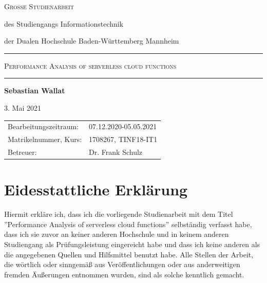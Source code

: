 \documentclass[12pt,a4paper,parskip=half]{scrreprt}
\begin{document}
\begin{titlepage}
{	}
	
	
	
	\bigskip
	
	
	
	\Large\textsc{Große Studienarbeit}
	
	
	
	\normalsize
	
	des Studiengangs Informationstechnik\par
	
	der Dualen Hochschule Baden-Württemberg Mannheim
	
	
	
	\rule{\textwidth}{.5mm}\bigskip
	
	
	
	\textsc{\large Performance Analysis of serverless cloud functions}	
	
	
	\rule{\textwidth}{.5mm}
	
	
	
	\vfill
	
	
	
	\par
	
	{\bfseries\large Sebastian Wallat}\par
	
	3. Mai 2021
	
	
	
	\vfill
	
	
	
	\small{%
		
		\begin{tabularx}{\textwidth}{@{}lX@{}}
			
			\toprule
			
			
			Bearbeitungszeitraum: & 07.12.2020-05.05.2021\\
			
			Matrikelnummer, Kurs: & 1708267, TINF18-IT1\\
			
			Betreuer: & Dr. Frank Schulz \\
			
		\end{tabularx}
		
	}
	
	\cleardoublepage
	
\end{titlepage}


\newpage
{}

\chapter*{Eidesstattliche Erklärung}
\vspace{50pt}
Hiermit erkläre ich, dass ich die vorliegende Studienarbeit mit dem Titel ''Performance Analysis of serverless cloud functions'' selbständig verfasst habe, dass ich sie zuvor an keiner anderen Hochschule und in keinem anderen Studiengang als Prüfungsleistung eingereicht habe und dass ich
keine anderen als die angegebenen Quellen und Hilfsmittel benutzt habe. Alle
Stellen der Arbeit, die wörtlich oder sinngemäß aus Veröffentlichungen oder aus
anderweitigen fremden Äußerungen entnommen wurden, sind als solche kenntlich
gemacht. 
\end{document}
